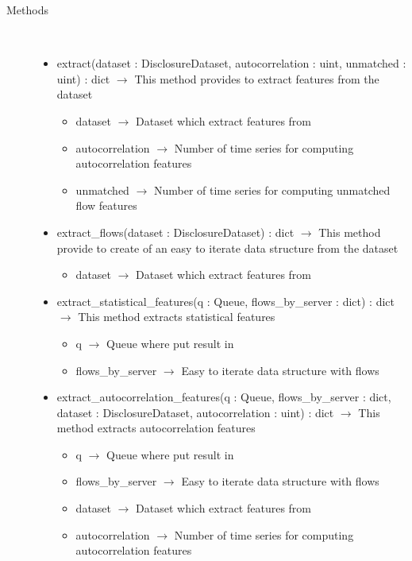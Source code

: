 \begin{description}
\item[Methods] \hfill \\
 \vspace{-1cm}
\begin{itemize}
\item extract(dataset : DisclosureDataset, autocorrelation : uint, unmatched : uint) : dict $\rightarrow$ This method provides to extract features from the dataset\begin{itemize}
\item dataset $\rightarrow$ Dataset which extract features from
\item autocorrelation $\rightarrow$ Number of time series for computing autocorrelation features
\item unmatched $\rightarrow$ Number of time series for computing unmatched flow features
\end{itemize}

\item extract\_flows(dataset : DisclosureDataset) : dict $\rightarrow$ This method provide to create of an easy to iterate data structure from the dataset\begin{itemize}
\item dataset $\rightarrow$ Dataset which extract features from
\end{itemize}

\item extract\_statistical\_features(q : Queue, flows\_by\_server : dict) : dict $\rightarrow$ This method extracts statistical features\begin{itemize}
\item q $\rightarrow$ Queue where put result in
\item flows\_by\_server $\rightarrow$ Easy to iterate data structure with flows
\end{itemize}

\item extract\_autocorrelation\_features(q : Queue, flows\_by\_server : dict, dataset : DisclosureDataset, autocorrelation : uint) : dict $\rightarrow$ This method extracts autocorrelation features\begin{itemize}
\item q $\rightarrow$ Queue where put result in
\item flows\_by\_server $\rightarrow$ Easy to iterate data structure with flows
\item dataset $\rightarrow$ Dataset which extract features from
\item autocorrelation $\rightarrow$ Number of time series for computing autocorrelation features
\end{itemize}


\end{itemize}
\end{description}

